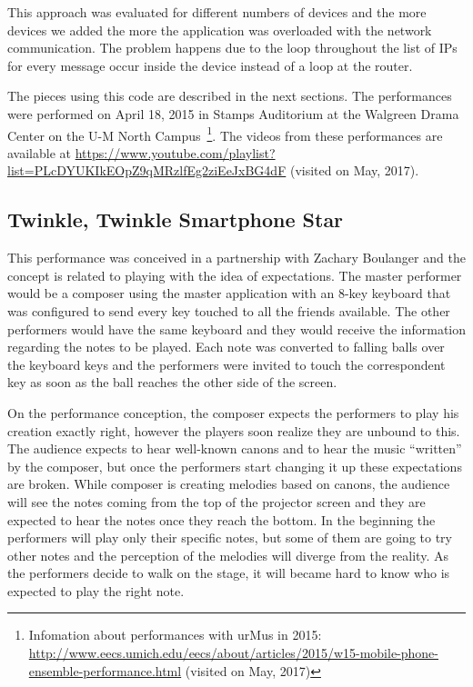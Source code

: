 This approach was evaluated for different numbers of devices and the more devices we added the more the application was overloaded with the network communication.
The problem happens due to the loop throughout the list of IPs for every message occur inside the device instead of a loop at the router.

The pieces using this code are described in the next sections.
The performances were performed on April 18, 2015 in Stamps Auditorium at the Walgreen Drama Center on the U-M North Campus~\footnote{Infomation about performances with urMus in 2015: \url{http://www.eecs.umich.edu/eecs/about/articles/2015/w15-mobile-phone-ensemble-performance.html} (visited on May, 2017)}.
The videos from these performances are available at \url{https://www.youtube.com/playlist?list=PLcDYUKIkEOpZ9qMRzlfEg2ziEeJxBG4dF} (visited on May, 2017).

\subsection*{Twinkle, Twinkle Smartphone Star}

This performance was conceived in a partnership with Zachary Boulanger and the concept is related to playing with the idea of expectations. 
The master performer would be a composer using the master application with an 8-key keyboard that was configured to send every key touched to all the friends available.
The other performers would have the same keyboard and they would receive the information regarding the notes to be played.
Each note was converted to falling balls over the keyboard keys and the performers were invited to touch the correspondent key as soon as the ball reaches the other side of the screen.

On the performance conception, the composer expects the performers to play his creation exactly right, however the players soon realize they are unbound to this.
The audience expects to hear well-known canons and to hear the music ``written'' by the composer, but once the performers start changing it up these expectations are broken.
While composer is creating melodies based on canons, the audience will see the notes coming from the top of the projector screen and they are expected to hear the notes once they reach the bottom. 
In the beginning the performers will play only their specific notes, but some of them are going to try other notes and the perception of the melodies will diverge from the reality. 
As the performers decide to walk on the stage, it will became hard to know who is expected to play the right note.

